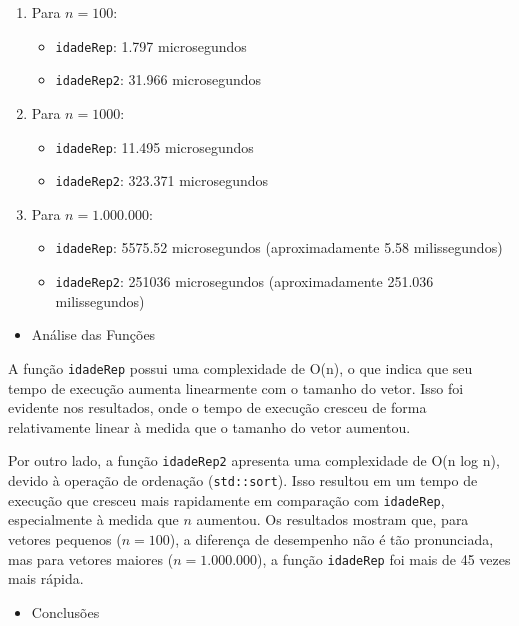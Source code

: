 \begin{enumerate}
    \item Para \( n = 100 \):
    \begin{itemize}
        \item \texttt{idadeRep}: 1.797 microsegundos
        \item \texttt{idadeRep2}: 31.966 microsegundos
    \end{itemize}

    \item Para \( n = 1000 \):
    \begin{itemize}
        \item \texttt{idadeRep}: 11.495 microsegundos
        \item \texttt{idadeRep2}: 323.371 microsegundos
    \end{itemize}

    \item Para \( n = 1.000.000 \):
    \begin{itemize}
        \item \texttt{idadeRep}: 5575.52 microsegundos (aproximadamente 5.58 milissegundos)
        \item \texttt{idadeRep2}: 251036 microsegundos (aproximadamente 251.036 milissegundos)
    \end{itemize}
\end{enumerate}

\begin{itemize}
    \item Análise das Funções
\end{itemize}
A função \texttt{idadeRep} possui uma complexidade de O(n), o que indica que seu tempo de execução aumenta linearmente com o tamanho do vetor. Isso foi evidente nos resultados, onde o tempo de execução cresceu de forma relativamente linear à medida que o tamanho do vetor aumentou.

Por outro lado, a função \texttt{idadeRep2} apresenta uma complexidade de O(n log n), devido à operação de ordenação (\texttt{std::sort}). Isso resultou em um tempo de execução que cresceu mais rapidamente em comparação com \texttt{idadeRep}, especialmente à medida que \( n \) aumentou. Os resultados mostram que, para vetores pequenos (\( n = 100 \)), a diferença de desempenho não é tão pronunciada, mas para vetores maiores (\( n = 1.000.000 \)), a função \texttt{idadeRep} foi mais de 45 vezes mais rápida.

\begin{itemize}
    \item Conclusões
\end{itemize}

